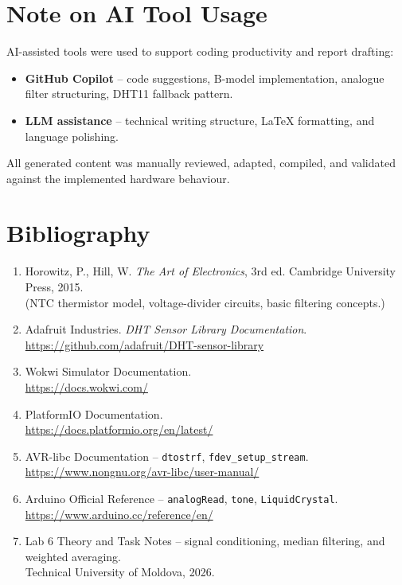 \documentclass[12pt]{article}
\begin{document}
\section*{Note on AI Tool Usage}
\hspace{0.8cm} AI-assisted tools were used to support coding productivity and report drafting:
\begin{itemize}
    \item \textbf{GitHub Copilot} -- code suggestions, B-model implementation, analogue filter structuring, DHT11 fallback pattern.
    \item \textbf{LLM assistance} -- technical writing structure, LaTeX formatting, and language polishing.
\end{itemize}
All generated content was manually reviewed, adapted, compiled, and validated against the implemented hardware behaviour.

\section*{Bibliography}
\begin{enumerate}
    \item Horowitz, P., Hill, W. \textit{The Art of Electronics}, 3rd ed. Cambridge University Press, 2015.\\
    (NTC thermistor model, voltage-divider circuits, basic filtering concepts.)

    \item Adafruit Industries. \textit{DHT Sensor Library Documentation}.\\
    \url{https://github.com/adafruit/DHT-sensor-library}

    \item Wokwi Simulator Documentation.\\
    \url{https://docs.wokwi.com/}

    \item PlatformIO Documentation.\\
    \url{https://docs.platformio.org/en/latest/}

    \item AVR-libc Documentation -- \texttt{dtostrf}, \texttt{fdev\_setup\_stream}.\\
    \url{https://www.nongnu.org/avr-libc/user-manual/}

    \item Arduino Official Reference -- \texttt{analogRead}, \texttt{tone}, \texttt{LiquidCrystal}.\\
    \url{https://www.arduino.cc/reference/en/}

    \item Lab 6 Theory and Task Notes -- signal conditioning, median filtering, and weighted averaging.\\
    Technical University of Moldova, 2026.
\end{enumerate}
\end{document}
